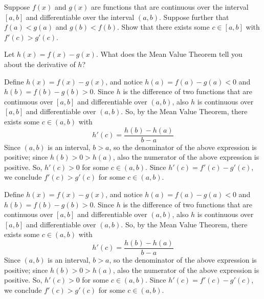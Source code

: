 \begin{question}
Suppose $f(x)$ and $g(x)$ are functions that are continuous over the interval $[a,b]$ and differentiable over the interval $(a,b)$. Suppose further that $f(a) < g(a)$ and $g(b)< f(b)$. Show that there exists some $c \in [a,b]$ with $f'(c)>g'(c)$.
\end{question}
\begin{hint}
Let $h(x)=f(x)-g(x)$. What does the Mean Value Theorem tell you about the derivative of $h$?
\end{hint}
\begin{answer}
Define $h(x)=f(x)-g(x)$, and notice $h(a)=f(a)-g(a)<0$ and $h(b)=f(b)-g(b)>0$. Since $h$ is the difference of two functions that are continuous over $[a,b]$ and differentiable over $(a,b)$, also $h$ is continuous over $[a,b]$ and differentiable over $(a,b)$. So, by the Mean Value Theorem, there exists some $c \in (a,b)$ with
\[h'(c)=\frac{h(b)-h(a)}{b-a}\]
Since $(a,b)$ is an interval, $b>a$, so the denominator of the above expression is positive; since $h(b)>0>h(a)$, also the numerator of the above expression is positive. So, $h'(c)>0$ for some $c \in (a,b)$. Since $h'(c)=f'(c)-g'(c)$, we conclude $f'(c)>g'(c)$ for some $c \in (a,b)$.
\end{answer}
\begin{solution}
Define $h(x)=f(x)-g(x)$, and notice $h(a)=f(a)-g(a)<0$ and $h(b)=f(b)-g(b)>0$. Since $h$ is the difference of two functions that are continuous over $[a,b]$ and differentiable over $(a,b)$, also $h$ is continuous over $[a,b]$ and differentiable over $(a,b)$. So, by the Mean Value Theorem, there exists some $c \in (a,b)$ with
\[h'(c)=\frac{h(b)-h(a)}{b-a}\]
Since $(a,b)$ is an interval, $b>a$, so the denominator of the above expression is positive; since $h(b)>0>h(a)$, also the numerator of the above expression is positive. So, $h'(c)>0$ for some $c \in (a,b)$. Since $h'(c)=f'(c)-g'(c)$, we conclude $f'(c)>g'(c)$ for some $c \in (a,b)$.
\end{solution}




